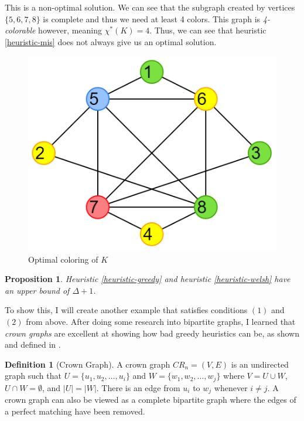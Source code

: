 \documentclass{article}
\newcounter{heuristic} \setcounter{heuristic}{0}
\newtheorem{prop}{Proposition}
\theoremstyle{definition}
\newtheorem{definition}{Definition}
\begin{document}
This is a non-optimal solution. We can see that the subgraph created by vertices \(\{5, 6, 7, 8\}\) is complete and thus we need at least 4 colors. This graph is \emph{4-colorable} however, meaning \(\chi^{*}(K) = 4\). Thus, we can see that heuristic \ref{heuristic-mis} does not always give us an optimal solution.

\begin{figure}[H]
\centering
\includegraphics[scale=0.38]{images/mis-3.png}
\caption{Optimal coloring of \(K\)}
\end{figure}

\begin{prop}
Heuristic \ref{heuristic-greedy} and heuristic \ref{heuristic-welsh} have an upper bound of \(\Delta + 1\).
\end{prop}

To show this, I will create another example that satisfies conditions \((1)\) and \((2)\) from above. After doing some research into bipartite graphs, I learned that \emph{crown graphs} are excellent at showing how bad greedy heuristics can be, as shown and defined in \cite{kordecki}.

\begin{definition}[Crown Graph]
A crown graph \(CR_n = (V, E)\) is an undirected graph such that \(U = \{u_1, u_2, \dots, u_i\}\) and \(W = \{w_1, w_2, \dots, w_j\}\) where \(V = U \cup W\), \(U \cap W = \emptyset\), and \(|U| = |W|\). There is an edge from \(u_i\) to \(w_j\) whenever \(i \neq j\). A crown graph can also be viewed as a complete bipartite graph where the edges of a perfect matching have been removed.
\end{definition}
\end{document}
